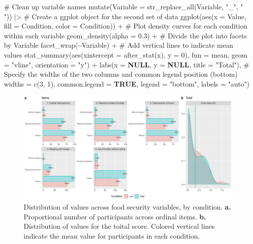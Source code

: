 \documentclass[
  bookmarksnumbered]{article}
\newenvironment{Shaded}{\begin{snugshade}}{\end{snugshade}}
\newcommand{\AttributeTok}[1]{\textcolor[rgb]{0.80,0.80,0.80}{#1}}
\newcommand{\CommentTok}[1]{\textcolor[rgb]{0.50,0.62,0.50}{#1}}
\newcommand{\ConstantTok}[1]{\textcolor[rgb]{0.86,0.64,0.64}{\textbf{#1}}}
\newcommand{\DecValTok}[1]{\textcolor[rgb]{0.86,0.86,0.80}{#1}}
\newcommand{\FloatTok}[1]{\textcolor[rgb]{0.75,0.75,0.82}{#1}}
\newcommand{\FunctionTok}[1]{\textcolor[rgb]{0.94,0.94,0.56}{#1}}
\newcommand{\NormalTok}[1]{\textcolor[rgb]{0.80,0.80,0.80}{#1}}
\newcommand{\SpecialCharTok}[1]{\textcolor[rgb]{0.86,0.64,0.64}{#1}}
\newcommand{\StringTok}[1]{\textcolor[rgb]{0.80,0.58,0.58}{#1}}
\begin{document}
\begin{Shaded}
\begin{Highlighting}[]
    \CommentTok{\# Clean up variable names}
    \FunctionTok{mutate}\NormalTok{(}\AttributeTok{Variable =} \FunctionTok{str\_replace\_all}\NormalTok{(Variable, }\StringTok{"\_"}\NormalTok{, }\StringTok{" "}\NormalTok{)) }\SpecialCharTok{|\textgreater{}}
    \CommentTok{\# Create a ggplot object for the second set of data}
    \FunctionTok{ggplot}\NormalTok{(}\FunctionTok{aes}\NormalTok{(}\AttributeTok{x =}\NormalTok{ Value, }\AttributeTok{fill =}\NormalTok{ Condition, }\AttributeTok{color =}\NormalTok{ Condition)) }\SpecialCharTok{+}
    \CommentTok{\# Plot density curves for each condition within each variable}
    \FunctionTok{geom\_density}\NormalTok{(}\AttributeTok{alpha =} \FloatTok{0.3}\NormalTok{) }\SpecialCharTok{+}
    \CommentTok{\# Divide the plot into facets by Variable}
    \FunctionTok{facet\_wrap}\NormalTok{(}\SpecialCharTok{\textasciitilde{}}\NormalTok{Variable) }\SpecialCharTok{+}
    \CommentTok{\# Add vertical lines to indicate mean values}
    \FunctionTok{stat\_summary}\NormalTok{(}\FunctionTok{aes}\NormalTok{(}\AttributeTok{xintercept =} \FunctionTok{after\_stat}\NormalTok{(x), }\AttributeTok{y =} \DecValTok{0}\NormalTok{),}
                 \AttributeTok{fun =}\NormalTok{ mean, }\AttributeTok{geom =} \StringTok{"vline"}\NormalTok{, }\AttributeTok{orientation =} \StringTok{"y"}\NormalTok{) }\SpecialCharTok{+}
    \FunctionTok{labs}\NormalTok{(}\AttributeTok{x =} \ConstantTok{NULL}\NormalTok{, }\AttributeTok{y =} \ConstantTok{NULL}\NormalTok{, }\AttributeTok{title =} \StringTok{"Total"}\NormalTok{),}
  \CommentTok{\# Specify the widths of the two columns and common legend position (bottom)}
  \AttributeTok{widths =} \FunctionTok{c}\NormalTok{(}\DecValTok{3}\NormalTok{, }\DecValTok{1}\NormalTok{),}
  \AttributeTok{common.legend =} \ConstantTok{TRUE}\NormalTok{,}
  \AttributeTok{legend =} \StringTok{"bottom"}\NormalTok{,}
  \AttributeTok{labels =} \StringTok{"auto"}\NormalTok{)}
\end{Highlighting}
\end{Shaded}

\begin{figure}
\centering
\includegraphics{Supplementary_material_files/figure-latex/foodsec-desc-plot-1.pdf}
\caption{\label{fig:foodsec-desc-plot}Distribution of values across food security variables, by condition. \textbf{a.} Proportional number of participants across ordinal items. \textbf{b.} Distribution of values for the toital score. Colored vertical lines indicate the mean value for participants in each condition.}
\end{figure}
\end{document}
